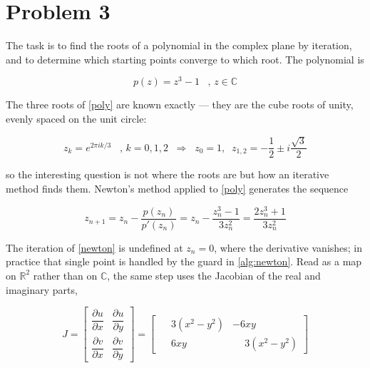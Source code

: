 
\section*{Problem 3}
{}

The task is to find the roots of a polynomial in the complex plane by
iteration, and to determine which starting points converge to which root. The
polynomial is

\begin{equation} \label{poly}
	p(z) = z^3 - 1 \; \; \; \text{, } z \in \mathbb{C}
\end{equation}

The three roots of \cref{poly} are known exactly — they are the cube roots of
unity, evenly spaced on the unit circle:

\begin{equation} \label{roots}
	z_k = e^{2\pi i k/3} \; \; \; \text{, } k = 0, 1, 2
	\; \; \Rightarrow \; \;
	z_0 = 1, \; \; z_{1,2} = -\frac{1}{2} \pm i\frac{\sqrt{3}}{2}
\end{equation}

so the interesting question is not where the roots are but how an iterative
method finds them. Newton's method applied to \cref{poly} generates the
sequence

\begin{equation} \label{newton}
	z_{n+1} = z_n - \frac{p(z_n)}{p'(z_n)}
	= z_n - \frac{z_n^3 - 1}{3z_n^2}
	= \frac{2z_n^3 + 1}{3z_n^2}
\end{equation}

The iteration of \cref{newton} is undefined at $z_n = 0$, where the derivative
vanishes; in practice that single point is handled by the guard in
\cref{alg:newton}. Read as a map on $\mathbb{R}^2$ rather than on $\mathbb{C}$,
the same step uses the Jacobian of the real and imaginary parts,

\begin{equation} \label{jacobian}
	J =
	\begin{bmatrix}
		\dfrac{\partial u}{\partial x} & \dfrac{\partial u}{\partial y} \\[10pt]
		\dfrac{\partial v}{\partial x} & \dfrac{\partial v}{\partial y}
	\end{bmatrix}
	=
	\begin{bmatrix}
		\phantom{-}3(x^2 - y^2) & -6xy \\[4pt]
		\phantom{-}6xy          & \phantom{-}3(x^2-y^2)
	\end{bmatrix}
\end{equation}

